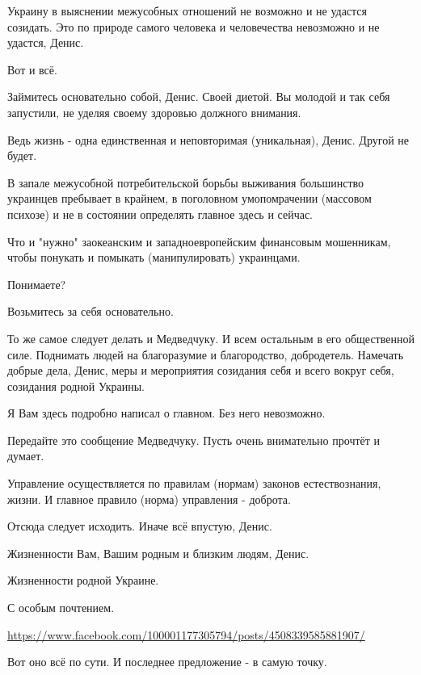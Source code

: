 \begin{itemize}
\begin{itemize}
Украину в выяснении межусобных отношений не возможно и не удастся созидать. Это
по природе самого человека и человечества невозможно и не удастся, Денис.

Вот и всё.

Займитесь основательно собой, Денис. Своей диетой. Вы молодой и так себя
запустили, не уделяя своему здоровью должного внимания.

Ведь жизнь - одна единственная и неповторимая (уникальная), Денис. Другой не
будет.

В запале межусобной потребительской борьбы выживания большинство украинцев
пребывает в крайнем, в поголовном умопомрачении (массовом психозе) и не в
состоянии определять главное здесь и сейчас.

Что и "нужно" заокеанским и западноевропейским финансовым мошенникам, чтобы
понукать и помыкать (манипулировать) украинцами.

Понимаете?

Возьмитесь за себя основательно.

То же самое следует делать и Медведчуку. И всем остальным в его общественной
силе. Поднимать людей на благоразумие и благородство, добродетель. Намечать
добрые дела, Денис, меры и мероприятия созидания себя и всего вокруг себя,
созидания родной Украины.

Я Вам здесь подробно написал о главном. Без него невозможно.

Передайте это сообщение Медведчуку. Пусть очень внимательно прочтёт и думает.

Управление осуществляется по правилам (нормам) законов естествознания, жизни. И
главное правило (норма) управления - доброта.

Отсюда следует исходить. Иначе всё впустую, Денис.

Жизненности Вам, Вашим родным и близким людям, Денис.

Жизненности родной Украине.

С особым почтением.


\url{https://www.facebook.com/100001177305794/posts/4508339585881907/}

Вот оно всё по сути. И последнее предложение - в самую точку.

\ifcmt


\end{itemize}
\end{itemize}
